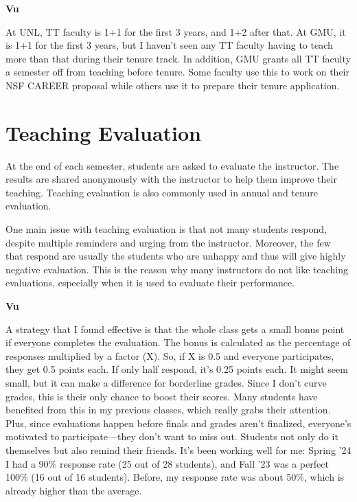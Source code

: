 \documentclass[oneside,11pt,dvipsnames]{book}
\newenvironment{commentbox}[1][]{
  \small
  \begin{mybox}
    {\small \textbf{#1}}
  }{
  \end{mybox}
}
\begin{document}
\begin{commentbox}[Vu]

  At UNL, TT faculty is 1+1 for the first 3 years, and 1+2 after that.  At GMU, it is 1+1 for the first 3 years, but I haven't seen any TT faculty having to teach more than that during their tenure track. In addition, GMU grants all TT faculty a semester off from teaching before tenure. Some faculty use this to work on their NSF CAREER proposal while others use it to prepare their tenure application. 

\end{commentbox}

\section{Teaching Evaluation}

At the end of each semester, students are asked to evaluate the instructor. The results are shared anonymously with the instructor to help them improve their teaching. Teaching evaluation is also commonly used in annual and tenure evaluation.

One main issue with teaching evaluation is that not many students respond, despite multiple reminders and urging from the instructor.  Moreover, the few that respond are usually the students who are unhappy and thus will give highly negative evaluation. This is the reason why many instructors do not like teaching evaluations, especially when it is used to evaluate their performance.

\begin{commentbox}[Vu]
A strategy that I found effective is that the whole class gets a small bonus point if everyone completes the evaluation. The bonus is calculated as the percentage of responses multiplied by a factor (X). So, if X is 0.5 and everyone participates, they get 0.5 points each. If only half respond, it's 0.25 points each. It might seem small, but it can make a difference for borderline grades. Since I don't curve grades, this is their only chance to boost their scores. Many students have benefited from this in my previous classes, which really grabs their attention. Plus, since evaluations happen before finals and grades aren't finalized, everyone's motivated to participate—they don't want to miss out. Students not only do it themselves but also remind their friends. It's been working well for me: Spring '24 I had a 90\% response rate (25 out of 28 students), and Fall '23 was a perfect 100\% (16 out of 16 students). Before, my response rate was about 50\%, which is already higher than the average.
\end{commentbox}
\end{document}
